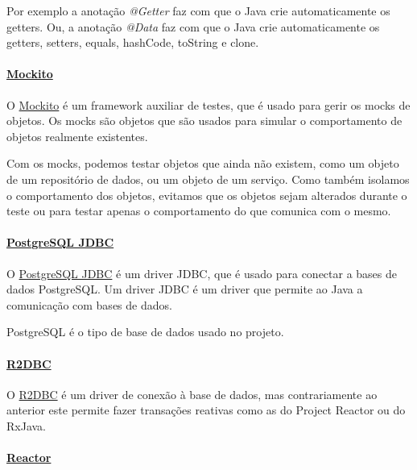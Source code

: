 Por exemplo a anotação \textit{@Getter} faz com que o Java crie automaticamente os getters. Ou, a anotação \textit{@Data} faz com que o Java crie automaticamente os getters, setters, equals, hashCode, toString e clone.

\paragraph{\href{https://site.mockito.org/}{Mockito}\\}

O \href{https://site.mockito.org/}{Mockito} é um framework auxiliar de testes, que é usado para gerir os mocks de objetos. Os mocks são objetos que são usados para simular o comportamento de objetos realmente existentes.\cite{mockito}

Com os mocks, podemos testar objetos que ainda não existem, como um objeto de um repositório de dados, ou um objeto de um serviço. Como também isolamos o comportamento dos objetos, evitamos que os objetos sejam alterados durante o teste ou para testar apenas o comportamento do que comunica com o mesmo.

\paragraph{\href{https://jdbc.postgresql.org/}{PostgreSQL JDBC}\\}

O \href{https://jdbc.postgresql.org/}{PostgreSQL JDBC} é um driver JDBC, que é usado para conectar a bases de dados PostgreSQL. Um driver JDBC é um driver que permite ao Java a comunicação com bases de dados.\cite{postgresql}

PostgreSQL é o tipo de base de dados usado no projeto.

\paragraph{\href{https://r2dbc.io/}{R2DBC}\\}

O \href{https://r2dbc.io/}{R2DBC} é um driver de conexão à base de dados, mas contrariamente ao anterior este permite fazer transações reativas como as do Project Reactor ou do RxJava.\cite{r2dbc}

\paragraph{\href{https://projectreactor.io/}{Reactor}\\}

